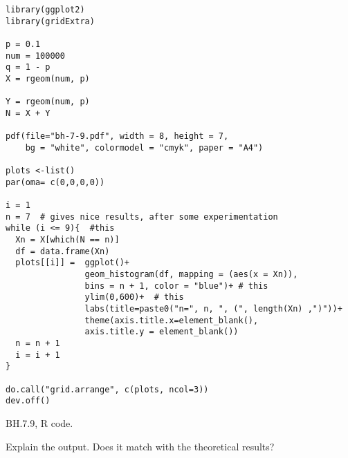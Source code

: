 \begin{listing}[!ht]
\begin{verbatim}
library(ggplot2)
library(gridExtra)

p = 0.1
num = 100000
q = 1 - p
X = rgeom(num, p)

Y = rgeom(num, p)
N = X + Y

pdf(file="bh-7-9.pdf", width = 8, height = 7,
    bg = "white", colormodel = "cmyk", paper = "A4")

plots <-list()
par(oma= c(0,0,0,0))

i = 1
n = 7  # gives nice results, after some experimentation
while (i <= 9){  #this
  Xn = X[which(N == n)]
  df = data.frame(Xn)
  plots[[i]] =  ggplot()+
                geom_histogram(df, mapping = (aes(x = Xn)),
                bins = n + 1, color = "blue")+ # this
                ylim(0,600)+  # this
                labs(title=paste0("n=", n, ", (", length(Xn) ,")"))+
                theme(axis.title.x=element_blank(),
                axis.title.y = element_blank())
  n = n + 1
  i = i + 1
}

do.call("grid.arrange", c(plots, ncol=3))
dev.off()
\end{verbatim}
\caption{BH.7.9, R code.}
\label{BH.7.9.r}

\end{listing}

\begin{exercise}
Explain the output. Does it match with the theoretical results?
\end{exercise}
